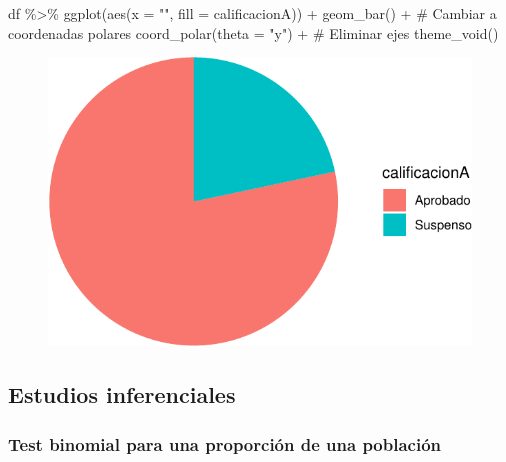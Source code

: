 \documentclass[
  a4paper,
]{scrreport}
\newenvironment{Shaded}{\begin{snugshade}}{\end{snugshade}}
\newcommand{\AttributeTok}[1]{\textcolor[rgb]{0.40,0.45,0.13}{#1}}
\newcommand{\CommentTok}[1]{\textcolor[rgb]{0.37,0.37,0.37}{#1}}
\newcommand{\FunctionTok}[1]{\textcolor[rgb]{0.28,0.35,0.67}{#1}}
\newcommand{\NormalTok}[1]{\textcolor[rgb]{0.00,0.23,0.31}{#1}}
\newcommand{\SpecialCharTok}[1]{\textcolor[rgb]{0.37,0.37,0.37}{#1}}
\newcommand{\StringTok}[1]{\textcolor[rgb]{0.13,0.47,0.30}{#1}}
\theoremstyle{definition}
\theoremstyle{definition}
\theoremstyle{remark}
\begin{document}
\begin{Shaded}
\begin{Highlighting}[]
\NormalTok{df }\SpecialCharTok{\%\textgreater{}\%} \FunctionTok{ggplot}\NormalTok{(}\FunctionTok{aes}\NormalTok{(}\AttributeTok{x =} \StringTok{""}\NormalTok{, }\AttributeTok{fill =}\NormalTok{ calificacionA)) }\SpecialCharTok{+} 
  \FunctionTok{geom\_bar}\NormalTok{() }\SpecialCharTok{+}
  \CommentTok{\# Cambiar a coordenadas polares}
  \FunctionTok{coord\_polar}\NormalTok{(}\AttributeTok{theta =} \StringTok{"y"}\NormalTok{) }\SpecialCharTok{+}
  \CommentTok{\# Eliminar ejes}
   \FunctionTok{theme\_void}\NormalTok{()}
\end{Highlighting}
\end{Shaded}

\begin{figure}[H]

{\centering \includegraphics{./08-analisis-estadisticos_files/figure-pdf/unnamed-chunk-23-1.pdf}

}

\end{figure}

\hypertarget{estudios-inferenciales-1}{%
\subsection{Estudios inferenciales}\label{estudios-inferenciales-1}}

\hypertarget{test-binomial-para-una-proporciuxf3n-de-una-poblaciuxf3n}{%
\subsubsection{Test binomial para una proporción de una
población}\label{test-binomial-para-una-proporciuxf3n-de-una-poblaciuxf3n}}
\end{document}
